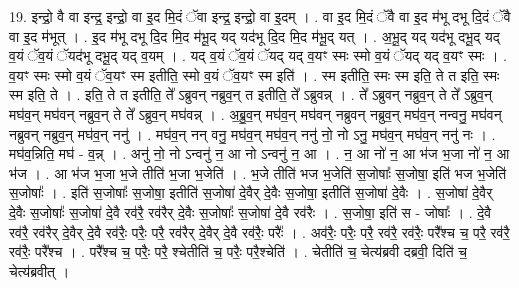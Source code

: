 \documentclass[17pt]{extarticle}
\begin{document}
19. इन्द्रो॒ वै वा इन्द्र॒ इन्द्रो॒ वा इ॒द मि॒दं ॅवा इन्द्र॒ इन्द्रो॒ वा इ॒दम् । . वा इ॒द मि॒दं ॅवै वा इ॒द म॑भू दभू दि॒दं ॅवै वा इ॒द म॑भूत् । . इ॒द म॑भू दभू दि॒द मि॒द म॑भू॒द् यद् यद॑भू दि॒द मि॒द म॑भू॒द् यत् । . अ॒भू॒द् यद् यद॑भू दभू॒द् यद् व॒यं ॅव॒यं ॅयद॑भू दभू॒द् यद् व॒यम् । . यद् व॒यं ॅव॒यं ॅयद् यद् व॒यꣳ स्मः स्मो व॒यं ॅयद् यद् व॒यꣳ स्मः । . व॒यꣳ स्मः स्मो व॒यं ॅव॒यꣳ स्म इतीति॒ स्मो व॒यं ॅव॒यꣳ स्म इति॑ । . स्म इतीति॒ स्मः स्म इति॒ ते त इति॒ स्मः स्म इति॒ ते । . इति॒ ते त इतीति॒ ते᳚ ऽब्रुवन् नब्रुव॒न् त इतीति॒ ते᳚ ऽब्रुवन्न् । . ते᳚ ऽब्रुवन् नब्रुव॒न् ते ते᳚ ऽब्रुव॒न् मघ॑व॒न् मघ॑वन् नब्रुव॒न् ते ते᳚ ऽब्रुव॒न् मघ॑वन्न् । . अ॒ब्रु॒व॒न् मघ॑व॒न् मघ॑वन् नब्रुवन् नब्रुव॒न् मघ॑व॒न् नन्वनु॒ मघ॑वन् नब्रुवन् नब्रुव॒न् मघ॑व॒न् ननु॑ । . मघ॑व॒न् नन् वनु॒ मघ॑व॒न् मघ॑व॒न् ननु॑ नो॒ नो ऽनु॒ मघ॑व॒न् मघ॑व॒न् ननु॑ नः । . मघ॑व॒न्निति॒ मघ॑ - व॒न्न् । . अनु॑ नो॒ नो ऽन्वनु॑ न॒ आ नो ऽन्वनु॑ न॒ आ । . न॒ आ नो॑ न॒ आ भ॑ज भ॒जा नो॑ न॒ आ भ॑ज । . आ भ॑ज भ॒जा भ॒जे तीति॑ भ॒जा भ॒जेति॑ । . भ॒जे तीति॑ भज भ॒जेति॑ स॒जोषाः᳚ स॒जोषा॒ इति॑ भज भ॒जेति॑ स॒जोषाः᳚ । . इति॑ स॒जोषाः᳚ स॒जोषा॒ इतीति॑ स॒जोषा॑ दे॒वैर् दे॒वैः स॒जोषा॒ इतीति॑ स॒जोषा॑ दे॒वैः । . स॒जोषा॑ दे॒वैर् दे॒वैः स॒जोषाः᳚ स॒जोषा॑ दे॒वै रव॑रै॒ रव॑रैर् दे॒वैः स॒जोषाः᳚ स॒जोषा॑ दे॒वै रव॑रैः । . स॒जोषा॒ इति॑ स - जोषाः᳚ । . दे॒वै रव॑रै॒ रव॑रैर् दे॒वैर् दे॒वै रव॑रैः॒ परैः॒ परै॒ रव॑रैर् दे॒वैर् दे॒वै रव॑रैः॒ परैः᳚ । . अव॑रैः॒ परैः॒ परै॒ रव॑रै॒ रव॑रैः॒ परै᳚श्च च॒ परै॒ रव॑रै॒ रव॑रैः॒ परै᳚श्च । . परै᳚श्च च॒ परैः॒ परै॒ श्चेतीति॑ च॒ परैः॒ परै॒श्चेति॑ । . चेतीति॑ च॒ चेत्य॑ब्रवी दब्रवी॒ दिति॑ च॒ चेत्य॑ब्रवीत् । \newline
\end{document}
